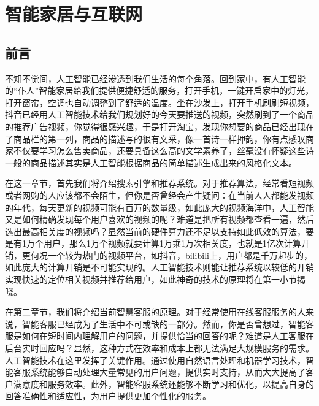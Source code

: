 \setchapterpreamble[u]{\margintoc}
\chapter[智能家居与互联网]{智能家居与互联网\footnotemark[0]}



\section{前言}

不知不觉间，人工智能已经渗透到我们生活的每个角落。回到家中，有人工智能的“仆人”智能家居给我们提供便捷舒适的服务，打开手机，一键开启家中的灯光，打开窗帘，空调也自动调整到了舒适的温度。坐在沙发上，打开手机刷刷短视频，抖音已经用人工智能技术给我们规划好的今天要推送的视频，突然刷到了一个商品的推荐广告视频，你觉得很感兴趣，于是打开淘宝，发现你想要的商品已经出现在了商品栏的第一列，商品的描述写的很有文采，像一首诗一样押韵，你有点感叹商家不仅要学习怎么售卖商品，还要具备这么高的文学素养了，丝毫没有怀疑这些诗一般的商品描述其实是人工智能根据商品的简单描述生成出来的风格化文本。

在这一章节，首先我们将介绍搜索引擎和推荐系统。对于推荐算法，经常看短视频或者网购的人应该都不会陌生，但你是否曾经会产生疑问：在当前人人都能发视频的年代，每天更新的视频可能有百万的数量级，如此庞大的视频海洋中，人工智能又是如何精确发现每个用户喜欢的视频的呢？难道是把所有视频都查看一遍，然后选出最高相关度的视频吗？显然当前的硬件算力还不足以支持如此低效的算法，要是有1万个用户，那么1万个视频就要计算1万乘1万次相关度，也就是1亿次计算开销，更何况一个较为热门的视频平台，如抖音，bilibili上，用户都是千万起步的，如此庞大的计算开销是不可能实现的。人工智能技术则能让推荐系统以较低的开销实现快速的定位相关视频并推荐给用户，如此神奇的技术的原理将在第一小节揭晓。

在第二章节，我们将介绍当前智慧客服的原理。对于经常使用在线客服服务的人来说，智能客服已经成为了生活中不可或缺的一部分。然而，你是否曾想过，智能客服是如何在短时间内理解用户的问题，并提供恰当的回答的呢？难道是人工客服在后台实时回应吗？显然，这种方式在效率和成本上都无法满足大规模服务的需求。人工智能技术在这里发挥了关键作用。通过使用自然语言处理和机器学习技术，智能客服系统能够自动处理大量常见的用户问题，提供实时支持，从而大大提高了客户满意度和服务效率。此外，智能客服系统还能够不断学习和优化，以提高自身的回答准确性和适应性，为用户提供更加个性化的服务。

